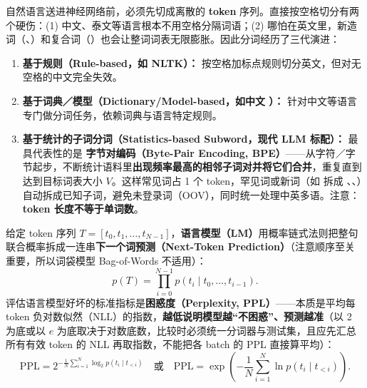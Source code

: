 自然语言送进神经网络前，必须先切成离散的 \textbf{token} 序列。直接按空格切分有两个硬伤：(1) 中文、泰文等语言根本不用空格分隔词语；(2) 哪怕在英文里，新造词（、）和复合词（）也会让整词词表无限膨胀。因此分词经历了三代演进：
\begin{enumerate}
\item \textbf{基于规则（Rule-based，如 NLTK）：} 按空格加标点规则切分英文，但对无空格的中文完全失效。
\item \textbf{基于词典／模型（Dictionary/Model-based，如中文 ）：} 针对中文等语言专门做分词任务，依赖词典与语言特定规则。
\item \textbf{基于统计的子词分词（Statistics-based Subword，现代 LLM 标配）：} 最具代表性的是 \textbf{字节对编码（Byte-Pair Encoding, BPE）}——从字符／字节起步，不断统计语料里\textbf{出现频率最高的相邻子词对并将它们合并}，重复直到达到目标词表大小 $V$。这样常见词占 1 个 token，罕见词或新词（如  拆成 、、）自动拆成已知子词，避免未登录词（OOV），同时统一处理中英多语。注意：\textbf{token 长度不等于单词数}。
\end{enumerate}


给定 token 序列 $T = [t_0, t_1, \dots, t_{N-1}]$，\textbf{语言模型（LM）}用概率链式法则把整句联合概率拆成一连串\textbf{下一个词预测（Next-Token Prediction）}（注意顺序至关重要，所以词袋模型 Bag-of-Words 不适用）：
\[
p(T) = \prod_{i=0}^{N-1} p(t_i \mid t_0, \dots, t_{i-1}).
\tag{11.1}
\]
评估语言模型好坏的标准指标是\textbf{困惑度（Perplexity, PPL）}——本质是平均每 token 负对数似然（NLL）的指数，\textbf{越低说明模型越“不困惑”、预测越准}（以 2 为底或以 $e$ 为底取决于对数底数，比较时必须统一分词器与测试集，且应先汇总所有有效 token 的 NLL 再取指数，不能把各 batch 的 PPL 直接算平均）：
\[
\mathrm{PPL} = 2^{-\frac{1}{N}\sum_{i=1}^N \log_2 p(t_i\mid t_{<i})}
\quad\text{或}\quad
\mathrm{PPL} = \exp\!\left(-\frac{1}{N}\sum_{i=1}^N \ln p(t_i\mid t_{<i})\right).
\tag{11.2}
\]

